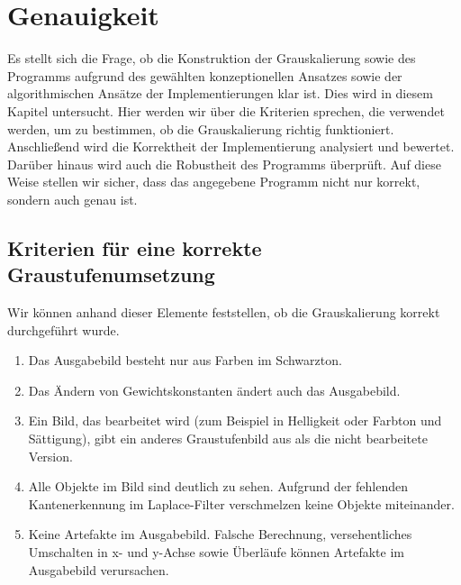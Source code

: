 \documentclass[course=asp]{aspdoc}
\begin{document}

\section{Genauigkeit}
Es stellt sich die Frage, ob die Konstruktion der Grauskalierung sowie des Programms aufgrund des gewählten konzeptionellen Ansatzes sowie der algorithmischen Ansätze der Implementierungen klar ist. Dies wird in diesem Kapitel untersucht. Hier werden wir über die Kriterien sprechen, die verwendet werden, um zu bestimmen, ob die Grauskalierung richtig funktioniert. Anschließend wird die Korrektheit der Implementierung analysiert und bewertet. Darüber hinaus wird auch die Robustheit des Programms überprüft. Auf diese Weise stellen wir sicher, dass das angegebene Programm nicht nur korrekt, sondern auch genau ist.

\subsection{Kriterien für eine korrekte Graustufenumsetzung}
Wir können anhand dieser Elemente feststellen, ob die Grauskalierung korrekt durchgeführt wurde.

\begin{enumerate}
\item Das Ausgabebild besteht nur aus Farben im Schwarzton.
\item Das Ändern von Gewichtskonstanten ändert auch das Ausgabebild.
\item Ein Bild, das bearbeitet wird (zum Beispiel in Helligkeit oder Farbton und Sättigung), gibt ein anderes Graustufenbild aus als die nicht bearbeitete Version.
\item Alle Objekte im Bild sind deutlich zu sehen. Aufgrund der fehlenden Kantenerkennung im Laplace-Filter verschmelzen keine Objekte miteinander.
\item Keine Artefakte im Ausgabebild. Falsche Berechnung, versehentliches Umschalten in x- und y-Achse sowie Überläufe können Artefakte im Ausgabebild verursachen.
\end{enumerate}
\end{document}
